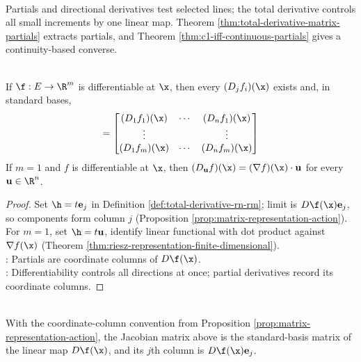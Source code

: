 \begin{perspective} \label{per:partials-are-coordinate-tests} \\
Partials and directional derivatives test selected lines; the total derivative controls all small increments by one linear map. Theorem \ref{thm:total-derivative-matrix-partials} extracts partials, and Theorem \ref{thm:c1-iff-continuous-partials} gives a continuity-based converse.
\end{perspective}

\begin{theorem} \label{thm:total-derivative-matrix-partials} \\
If $\f:E\to\R^m$ is differentiable at $\x$, then every $(D_jf_i)(\x)$ exists and, in standard bases,
\begin{align}
[D\f(\x)] =
\begin{bmatrix}
(D_1f_1)(\x) & \cdots & (D_nf_1)(\x)\\
\vdots & & \vdots\\
(D_1f_m)(\x) & \cdots & (D_nf_m)(\x)
\end{bmatrix} \nonumber
\end{align}
If $m=1$ and $f$ is differentiable at $\x$, then $(D_{\mathbf{u}}f)(\x)=(\nabla f)(\x)\cdot\mathbf{u}$ for every $\mathbf{u}\in\R^n$.
\begin{proof}
Set $\h=t\mathbf{e}_j$ in Definition \ref{def:total-derivative-rn-rm}; limit is $D\f(\x)\mathbf{e}_j$, so components form column $j$ (Proposition \ref{prop:matrix-representation-action}).\\
For $m=1$, set $\h=t\mathbf{u}$, identify linear functional with dot product against $\nabla f(\x)$ (Theorem \ref{thm:riesz-representation-finite-dimensional}).\\
: Partials are coordinate columns of $D\f(\x)$.\\
: Differentiability controls all directions at once; partial derivatives record its coordinate columns.
\end{proof}
\end{theorem}

\begin{remark} \label{rem:several-variable-row-column-conventions} \\
With the coordinate-column convention from Proposition \ref{prop:matrix-representation-action}, the Jacobian matrix above is the standard-basis matrix of the linear map $D\f(\x)$, and its $j$th column is $D\f(\x)\mathbf{e}_j$.
\end{remark}

